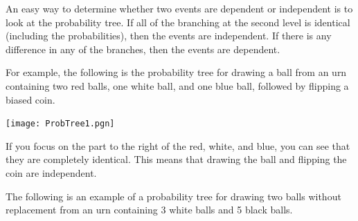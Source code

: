 \documentclass{ximera}
\begin{document}
An easy way to determine whether two events are dependent or independent is to look at the probability tree. If all of the branching at the second level is identical (including the probabilities), then the events are independent. If there is any difference in any of the branches, then the events are dependent.

For example, the following is the probability tree for drawing a ball from an urn containing two red balls, one white ball, and one blue ball, followed by flipping a biased coin.

\begin{image}
\texttt{[image: ProbTree1.pgn]}
\end{image}


If you focus on the part to the right of the red, white, and blue, you can see that they are completely identical. This means that drawing the ball and flipping the coin are independent.

The following is an example of a probability tree for drawing two balls without replacement from an urn containing 3 white balls and 5 black balls.
\end{document}
